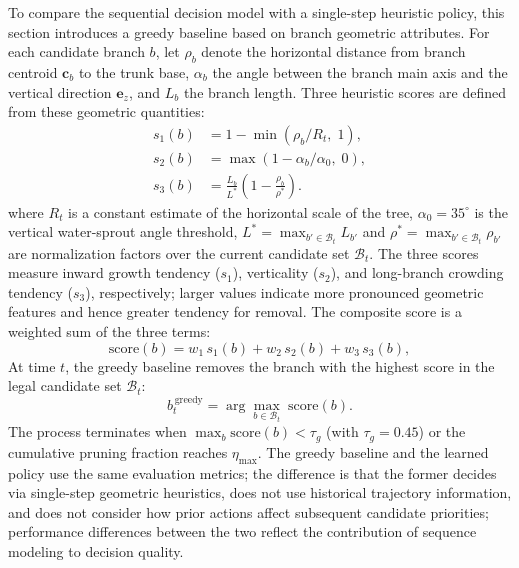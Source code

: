 \documentclass[12pt,a4paper,fontset=fandol]{ctexart}
\newcommand{\cb}[1][b]{\mathbf{c}_{#1}}
\begin{document}
To compare the sequential decision model with a single-step heuristic policy, this section introduces a greedy baseline based on branch geometric attributes.
For each candidate branch $b$, let $\rho_b$ denote the horizontal distance from branch centroid $\cb$ to the trunk base,
$\alpha_b$ the angle between the branch main axis and the vertical direction $\mathbf{e}_z$,
and $L_b$ the branch length.
Three heuristic scores are defined from these geometric quantities:
\begin{equation}\label{eq:greedy_score}
\begin{aligned}
  s_1(b) &= 1 - \min\!\left(\rho_b / R_t,\; 1\right), \\
  s_2(b) &= \max\!\left(1 - \alpha_b / \alpha_0,\; 0\right), \\
  s_3(b) &= \frac{L_b}{L^{*}} \left(1 - \frac{\rho_b}{\rho^{*}}\right).
\end{aligned}
\end{equation}
where $R_t$ is a constant estimate of the horizontal scale of the tree, $\alpha_0 = 35^\circ$ is the vertical water-sprout angle threshold,
$L^{*} = \max_{b' \in \mathcal{B}_t} L_{b'}$ and $\rho^{*} = \max_{b' \in \mathcal{B}_t} \rho_{b'}$
are normalization factors over the current candidate set $\mathcal{B}_t$.
The three scores measure inward growth tendency ($s_1$), verticality ($s_2$), and long-branch crowding tendency ($s_3$), respectively;
larger values indicate more pronounced geometric features and hence greater tendency for removal.
The composite score is a weighted sum of the three terms:
\begin{equation}\label{eq:greedy_total}
  \mathrm{score}(b) = w_1\,s_1(b) + w_2\,s_2(b) + w_3\,s_3(b),
\end{equation}
At time $t$, the greedy baseline removes the branch with the highest score in the legal candidate set $\mathcal{B}_t$:
\begin{equation}\label{eq:greedy_action}
  b_t^{\,\text{greedy}} = \arg\max_{b \in \mathcal{B}_t}\; \mathrm{score}(b).
\end{equation}
The process terminates when $\max_b \mathrm{score}(b) < \tau_g$ (with $\tau_g = 0.45$)
or the cumulative pruning fraction reaches $\eta_{\max}$.
The greedy baseline and the learned policy use the same evaluation metrics;
the difference is that the former decides via single-step geometric heuristics,
does not use historical trajectory information,
and does not consider how prior actions affect subsequent candidate priorities;
performance differences between the two reflect the contribution of sequence modeling to decision quality.
\end{document}
